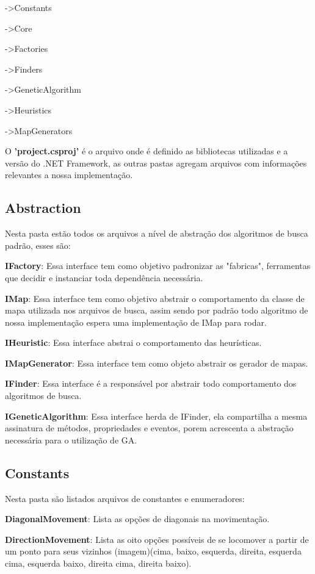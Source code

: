 ->Constants

->Core

->Factories

->Finders

->GeneticAlgorithm

->Heuristics

->MapGenerators

O \textbf{'project.csproj'} é o arquivo onde é definido as bibliotecas utilizadas e a versão do .NET Framework, as outras pastas agregam arquivos com informações
relevantes a nossa implementação.

\subsection{Abstraction}	

Nesta pasta estão todos os arquivos a nível de abstração dos algoritmos de busca padrão, esses são:

\textbf{IFactory}: Essa interface tem como objetivo padronizar as "fabricas", ferramentas que decidir e instanciar toda dependência necessária.

\textbf{IMap}: Essa interface tem como objetivo abstrair o comportamento da classe de mapa utilizada nos arquivos de busca, assim sendo por padrão todo algoritmo de
nossa implementação espera uma implementação de IMap para rodar.

\textbf{IHeuristic}: Essa interface abstrai o comportamento das heurísticas.

\textbf{IMapGenerator}: Essa interface tem como objeto abstrair os gerador de mapas.

\textbf{IFinder}: Essa interface é a responsável por abstrair todo comportamento dos algoritmos de busca.

\textbf{IGeneticAlgorithm}: Essa interface herda de IFinder, ela compartilha a mesma assinatura de métodos, propriedades e eventos, porem acrescenta a abstração necessária para
o utilização de GA.

\subsection{Constants}

Nesta pasta são listados arquivos de constantes e enumeradores:

\textbf{DiagonalMovement}: Lista as opções de diagonais na movimentação.

\textbf{DirectionMovement}: Lista as oito opções possíveis de se locomover a partir de um ponto para seus vizinhos 
(imagem)(cima, baixo, esquerda, direita, esquerda cima, esquerda baixo, direita cima, direita baixo).

